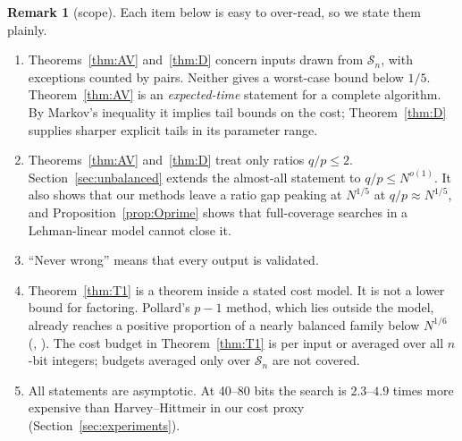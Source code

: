 \documentclass[11pt]{amsart}
\theoremstyle{definition}
\newtheorem{remark}[theorem]{Remark}
\newcommand{\Sn}{\mathcal{S}_n}
\begin{document}
\begin{remark}[scope]\label{rem:scope}
Each item below is easy to over-read, so we state them plainly.
\begin{enumerate}[label=(\alph*)]
\item Theorems~\ref{thm:AV} and~\ref{thm:D} concern inputs drawn from $\Sn$, with exceptions
  counted by pairs. Neither gives a worst-case bound below $1/5$. Theorem~\ref{thm:AV} is an
  \emph{expected-time} statement for a complete algorithm. By Markov's inequality it implies
  tail bounds on the cost; Theorem~\ref{thm:D} supplies sharper explicit tails in its parameter
  range.
\item Theorems~\ref{thm:AV} and~\ref{thm:D} treat only ratios $q/p\le2$.
  Section~\ref{sec:unbalanced} extends the almost-all statement to $q/p\le N^{o(1)}$. It also
  shows that our methods leave a ratio gap peaking at $N^{1/5}$ at $q/p\approx N^{1/5}$, and
  Proposition~\ref{prop:Oprime} shows that full-coverage searches in a Lehman-linear model cannot
  close it.
\item ``Never wrong'' means that every output is validated.
\item Theorem~\ref{thm:T1} is a theorem inside a stated cost model. It is not a lower bound for
  factoring. Pollard's $p-1$ method, which lies outside the model, already reaches a positive
  proportion of a nearly balanced family below $N^{1/6}$ (\cite[Prop.~35.3]{wardmaestro2026},
  \cite{friedlander1989}). The cost budget in Theorem~\ref{thm:T1} is per input or averaged over
  all $n$-bit integers; budgets averaged only over $\Sn$ are not covered.
\item All statements are asymptotic. At 40--80 bits the search is $2.3$--$4.9$ times more
  expensive than Harvey--Hittmeir in our cost proxy (Section~\ref{sec:experiments}).
\end{enumerate}
\end{remark}
\end{document}
